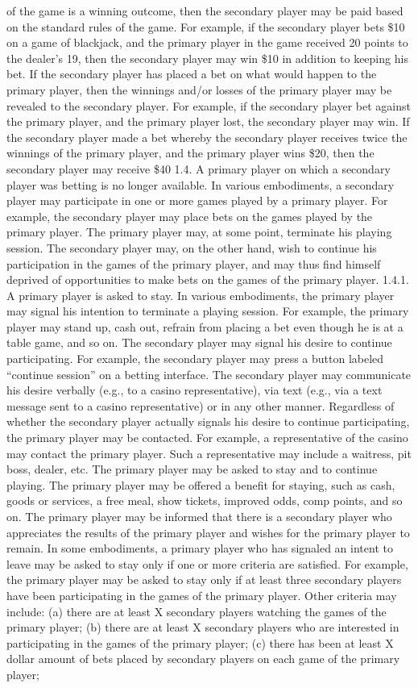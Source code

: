\documentclass[11pt,a4paper]{article}
\begin{document}
of the game is a winning outcome, then the secondary player may be paid based on the standard rules of the game. For example, if the secondary player bets \$10 on a game of blackjack, and the primary player in the game received 20 points to the dealer's 19, then the secondary player may win \$10 in addition to keeping his bet. If the secondary player has placed a bet on what would happen to the primary player, then the winnings and/or losses of the primary player may be revealed to the secondary player. For example, if the secondary player bet against the primary player, and the primary player lost, the secondary player may win. If the secondary player made a bet whereby the secondary player receives twice the winnings of the primary player, and the primary player wins \$20, then the secondary player may receive \$40 1.4. A primary player on which a secondary player was betting is no longer available. In various embodiments, a secondary player may participate in one or more games played by a primary player. For example, the secondary player may place bets on the games played by the primary player. The primary player may, at some point, terminate his playing session. The secondary player may, on the other hand, wish to continue his participation in the games of the primary player, and may thus find himself deprived of opportunities to make bets on the games of the primary player. 1.4.1. A primary player is asked to stay. In various embodiments, the primary player may signal his intention to terminate a playing session. For example, the primary player may stand up, cash out, refrain from placing a bet even though he is at a table game, and so on. The secondary player may signal his desire to continue participating. For example, the secondary player may press a button labeled “continue session” on a betting interface. The secondary player may communicate his desire verbally (e.g., to a casino representative), via text (e.g., via a text message sent to a casino representative) or in any other manner. Regardless of whether the secondary player actually signals his desire to continue participating, the primary player may be contacted. For example, a representative of the casino may contact the primary player. Such a representative may include a waitress, pit boss, dealer, etc. The primary player may be asked to stay and to continue playing. The primary player may be offered a benefit for staying, such as cash, goods or services, a free meal, show tickets, improved odds, comp points, and so on. The primary player may be informed that there is a secondary player who appreciates the results of the primary player and wishes for the primary player to remain. In some embodiments, a primary player who has signaled an intent to leave may be asked to stay only if one or more criteria are satisfied. For example, the primary player may be asked to stay only if at least three secondary players have been participating in the games of the primary player. Other criteria may include: (a) there are at least X secondary players watching the games of the primary player; (b) there are at least X secondary players who are interested in participating in the games of the primary player; (c) there has been at least X dollar amount of bets placed by secondary players on each game of the primary player; 
\end{document}
